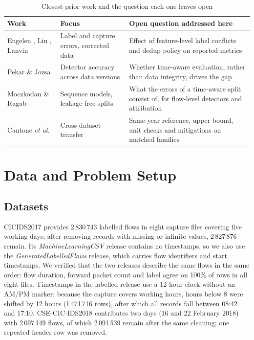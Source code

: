 \documentclass[conference]{IEEEtran}
\begin{document}
\begin{table}[t]
\centering
\caption{Closest prior work and the question each one leaves open}
\label{tab:prior}
\footnotesize
\setlength{\tabcolsep}{3pt}
\begin{tabular}{@{}p{}p{}p{}@{}}
\toprule
Work & Focus & Open question addressed here \\
\midrule
Engelen \cite{engelen2021}, Liu \cite{liu2022}, Lanvin \cite{lanvin2023} & Label and capture errors, corrected data & Effect of feature-level label conflicts and dedup policy on reported metrics \\
Pekar \& Jozsa \cite{pekar2024} & Detector accuracy across data versions & Whether time-aware evaluation, rather than data integrity, drives the gap \\
Moczkodan \& Ragab \cite{moczkodan2026} & Sequence models, leakage-free splits & What the errors of a time-aware split consist of, for flow-level detectors and attribution \\
Cantone \textit{et al.} \cite{cantone2024} & Cross-dataset transfer & Same-year reference, upper bound, unit checks and mitigations on matched families \\
\bottomrule
\end{tabular}
\end{table}

\section{Data and Problem Setup}

\subsection{Datasets}
CICIDS2017 provides 2\,830\,743 labelled flows in eight capture files covering five working days; after removing records with missing or infinite values, 2\,827\,876 remain. Its \textit{MachineLearningCSV} release contains no timestamps, so we also use the \textit{GeneratedLabelledFlows} release, which carries flow identifiers and start timestamps. We verified that the two releases describe the same flows in the same order: flow duration, forward packet count and label agree on 100\% of rows in all eight files. Timestamps in the labelled release use a 12-hour clock without an AM/PM marker; because the capture covers working hours, hours below 8 were shifted by 12 hours (1\,471\,716 rows), after which all records fall between 08:42 and 17:10. CSE-CIC-IDS2018 contributes two days (16 and 22 February 2018) with 2\,097\,149 flows, of which 2\,091\,539 remain after the same cleaning; one repeated header row was removed.
\end{document}
